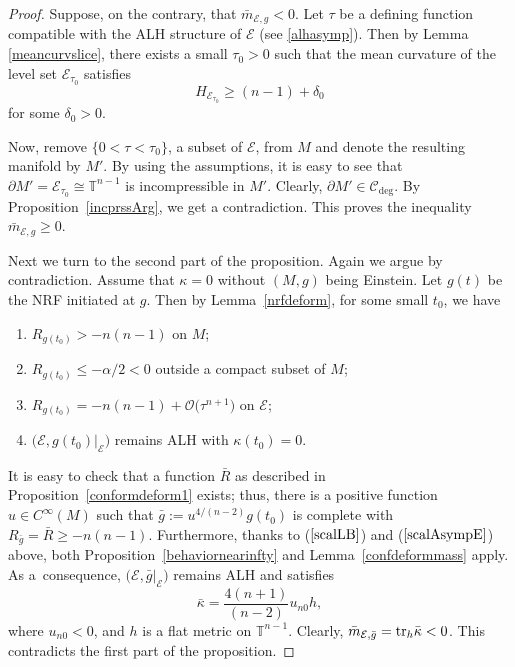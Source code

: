 \documentclass[10pt,a4paper]{amsart}
\numberwithin{equation}{section}
\def\tr{{\rm tr}}
\def\T{\mathbb{T}}
\def\Ccal{\mathcal{C}}
\def\Ecal{\mathcal{E}}
\def\Ocal{\mathcal{O}}
\def\tr{{\rm tr}}
\begin{document}
\begin{proof}
Suppose, on the contrary, that $\bar m_{\Ecal,g}< 0$.
Let $\tau$ be a defining function compatible with the ALH structure of $\Ecal$
(see \eqref{alhasymp}).
Then by Lemma \ref{meancurvslice},
there exists a small $\tau_0>0$ such that the mean curvature of the level set $\Ecal_{\tau_0}$ satisfies
\[
	H_{\Ecal_{\tau_0}} \geq (n-1)+\delta_0
\]
for some $\delta_0>0$.

Now, remove
$\{0< \tau< \tau_0\}$, a subset of $\Ecal$, from $M$ and denote the resulting manifold by $M'$.
By using the assumptions, it is easy to see that $\partial M' = \Ecal_{\tau_0}\cong \T^{n-1}$ is incompressible in $M'$.
Clearly, $\partial M'\in \Ccal_{\deg}$.
By Proposition~\ref{incprssArg},
we get a contradiction.
This proves the inequality $\bar m_{\Ecal, g}\ge 0$.

Next we turn to the second part of the proposition. Again we argue by contradiction.
Assume that $\kappa = 0$
without $(M,g)$ being Einstein. Let $g(t)$ be the NRF initiated at $g$.
Then by Lemma~\ref{nrfdeform}, for some small $t_0$, we have
\begin{enumerate}[$(i)$]\itemsep=0pt
	\item $R_{g(t_0)}>-n(n-1)$ on $M$;\label{scalLB}
	\item $R_{g(t_0)}\le -\alpha/2<0$ outside a compact subset of $M$;
	\item $R_{g(t_0)} = -n(n-1) + \Ocal\big(\tau^{n+1}\big)$ on $\Ecal$;	\label{scalAsympE}
	\item $\bigl(\Ecal, g(t_0)|_\Ecal\bigr)$ remains ALH with $\kappa(t_0) = 0$.
\end{enumerate}
It is easy to check that a function $\bar R$ as described in Proposition~\ref{conformdeform1} exists; thus, there is
a positive function $u\in C^\infty(M)$ such that $\bar g := u^{4/(n-2)}g(t_0)$ is complete
with  $R_{\bar g} = \bar R\ge -n(n-1)$. Furthermore, thanks to ($\ref{scalLB}$) and ($\ref{scalAsympE}$) above,
both Proposition~\ref{behaviornearinfty} and Lemma~\ref{confdeformmass} apply.
As a~consequence, $\bigl(\Ecal, \bar g|_\Ecal\bigr)$ remains ALH and satisfies
\[ \bar\kappa =  \frac{4(n+1)}{(n-2)} u_{n0} h,\] where
$u_{n0}<0$, and $h$ is a flat metric on $\T^{n-1}$.
Clearly, $\bar m_{\Ecal, \bar g} =\tr_h\bar\kappa < 0$. This contradicts the first part of
 the proposition.
\end{proof}
\end{document}

